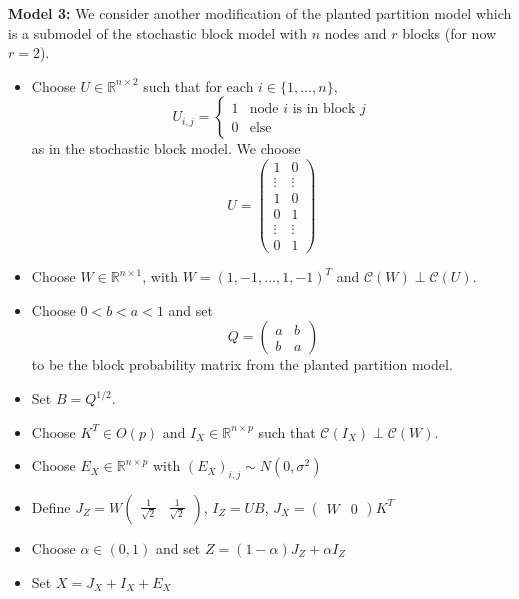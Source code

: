 \documentclass[notheorems]{beamer}
\theoremstyle{definition}
\newcommand{\sig}{\sigma}
\newcommand{\R}{\mathbb{R}}
\newcommand{\MC}{\mathcal{C}}
\begin{document}
\begin{frame}
\textbf{Model 3:}
We consider another modification of the planted partition model which is a submodel of the stochastic block model with $n$ nodes and $r$ blocks (for now $r=2$).
\begin{itemize}
    \item Choose $U \in \R^{n \times 2}$ such that for each $i \in \{1, \ldots, n\}$, 
    \[
    U_{i,j} = 
    \begin{cases}
    1 & \text{node $i$ is in block $j$} \\
    0 & \text{else}
    \end{cases}
    \] 
    as in the stochastic block model. We choose
    \[
    U = 
    \begin{pmatrix}
    1 & 0 \\
    \vdots & \vdots \\
    1 & 0 \\
    0 & 1 \\
    \vdots & \vdots \\
    0 & 1
    \end{pmatrix}
    \]
    \end{itemize}
    
    \end{frame}
    
    \begin{frame}
    
    \begin{itemize}
    \item Choose $W \in \R^{n \times 1}$, with $W = (1, -1, \ldots, 1, -1)^T$ and $\MC(W) \perp \MC(U)$. 
    \item Choose $0<b<a<1$ and set
    \[\
    Q = 
    \begin{pmatrix}
    a & b \\
    b & a
    \end{pmatrix}
    \]
    to be the block probability matrix from the planted partition model.
    \item Set $B = Q^{1/2}$.
    \item Choose $K^T \in O(p)$ and $I_X \in \R^{n \times p}$ such that $\MC(I_X) \perp \MC(W)$. 
    \item Choose $E_X \in \R^{n \times p}$ with $(E_X)_{i,j} \sim N(0, \sig^2)$
    \item Define $J_Z = W
    \begin{pmatrix}
    \frac{1}{\sqrt{2}} & \frac{1}{\sqrt{2}}
    \end{pmatrix}$, $I_Z = U B$, $J_X = 
    \begin{pmatrix}
    W & 0 
    \end{pmatrix}
    K^T$
     \item Choose $\alpha \in (0,1)$ and set $Z = (1 - \alpha) J_Z + \alpha I_Z$ 
    \item Set $X = 
     J_X + I_X + E_X$
\end{itemize}

\end{frame}
    
\end{document}

